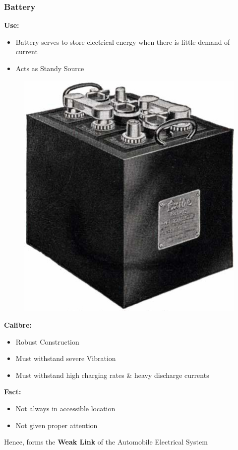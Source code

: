 \documentclass{beamer}
\begin{document}
\begin{frame}   %
\fontsize{8pt}{4}\selectfont
  \frametitle{Battery}

  \textbf{Use:}
  \begin{itemize}
    \item Battery serves to store electrical energy when there is little demand of current
    \item Acts as Standy Source
  \end{itemize}
  
  \vspace{-10pt}
  \begin{figure}
    \includegraphics[width=0.20\paperwidth]{./Resources/Images/battery.jpg}
  \end{figure}
  \vspace{-20pt}
    
  \textbf{Calibre:}  
  \begin{itemize}
    \item Robust Construction
    \item Must withstand severe Vibration
    \item Must withstand high charging rates \& heavy discharge currents
  \end{itemize}

  \bigskip
  \textbf{Fact:}
  \begin{itemize}
    \item Not always in accessible location
    \item Not given proper attention
  \end{itemize}  
  
  \begin{center}
    Hence, forms the \textbf{Weak Link} of the Automobile Electrical System
  \end{center}
\end{frame}
\end{document}
